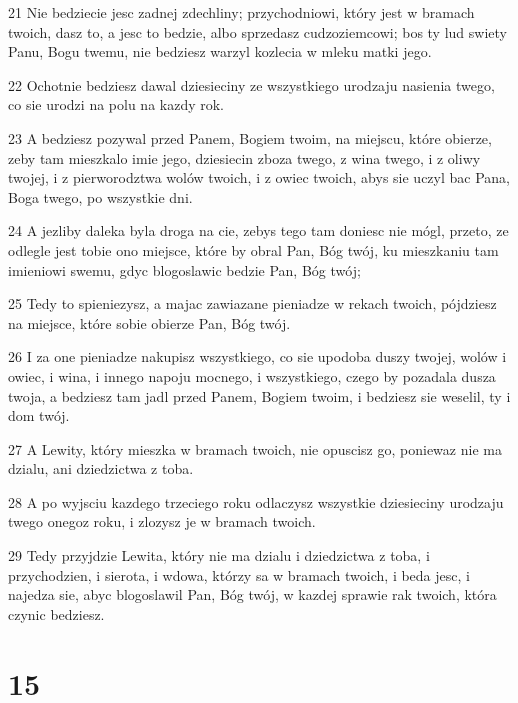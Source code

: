 \par 21 Nie bedziecie jesc zadnej zdechliny; przychodniowi, który jest w bramach twoich, dasz to, a jesc to bedzie, albo sprzedasz cudzoziemcowi; bos ty lud swiety Panu, Bogu twemu, nie bedziesz warzyl kozlecia w mleku matki jego.
\par 22 Ochotnie bedziesz dawal dziesieciny ze wszystkiego urodzaju nasienia twego, co sie urodzi na polu na kazdy rok.
\par 23 A bedziesz pozywal przed Panem, Bogiem twoim, na miejscu, które obierze, zeby tam mieszkalo imie jego, dziesiecin zboza twego, z wina twego, i z oliwy twojej, i z pierworodztwa wolów twoich, i z owiec twoich, abys sie uczyl bac Pana, Boga twego, po wszystkie dni.
\par 24 A jezliby daleka byla droga na cie, zebys tego tam doniesc nie mógl, przeto, ze odlegle jest tobie ono miejsce, które by obral Pan, Bóg twój, ku mieszkaniu tam imieniowi swemu, gdyc blogoslawic bedzie Pan, Bóg twój;
\par 25 Tedy to spieniezysz, a majac zawiazane pieniadze w rekach twoich, pójdziesz na miejsce, które sobie obierze Pan, Bóg twój.
\par 26 I za one pieniadze nakupisz wszystkiego, co sie upodoba duszy twojej, wolów i owiec, i wina, i innego napoju mocnego, i wszystkiego, czego by pozadala dusza twoja, a bedziesz tam jadl przed Panem, Bogiem twoim, i bedziesz sie weselil, ty i dom twój.
\par 27 A Lewity, który mieszka w bramach twoich, nie opuscisz go, poniewaz nie ma dzialu, ani dziedzictwa z toba.
\par 28 A po wyjsciu kazdego trzeciego roku odlaczysz wszystkie dziesieciny urodzaju twego onegoz roku, i zlozysz je w bramach twoich.
\par 29 Tedy przyjdzie Lewita, który nie ma dzialu i dziedzictwa z toba, i przychodzien, i sierota, i wdowa, którzy sa w bramach twoich, i beda jesc, i najedza sie, abyc blogoslawil Pan, Bóg twój, w kazdej sprawie rak twoich, która czynic bedziesz.

\chapter{15}

